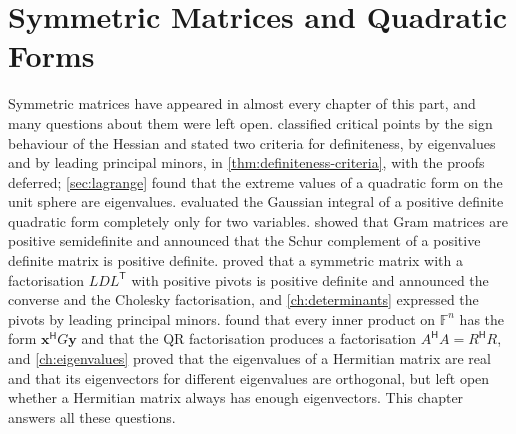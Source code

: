 \chapter{Symmetric Matrices and Quadratic Forms}
\label{ch:symmetric-matrices}


Symmetric matrices have appeared in almost every chapter of this part, and many questions about them were left open.  classified critical points by the sign behaviour of the Hessian and stated two criteria for definiteness, by eigenvalues and by leading principal minors, in \cref{thm:definiteness-criteria}, with the proofs deferred; \cref{sec:lagrange} found that the extreme values of a quadratic form on the unit sphere are eigenvalues.  evaluated the Gaussian integral of a positive definite quadratic form completely only for two variables.  showed that Gram matrices are positive semidefinite and announced that the Schur complement of a positive definite matrix is positive definite.  proved that a symmetric matrix with a factorisation $LDL^{\mathsf T}$ with positive pivots is positive definite and announced the converse and the Cholesky factorisation, and \cref{ch:determinants} expressed the pivots by leading principal minors.  found that every inner product on $\mathbb F^n$ has the form $\mathbf x^{\mathsf H}G\mathbf y$ and that the QR factorisation produces a factorisation $A^{\mathsf H}A=R^{\mathsf H}R$, and \cref{ch:eigenvalues} proved that the eigenvalues of a Hermitian matrix are real and that its eigenvectors for different eigenvalues are orthogonal, but left open whether a Hermitian matrix always has enough eigenvectors. This chapter answers all these questions.

